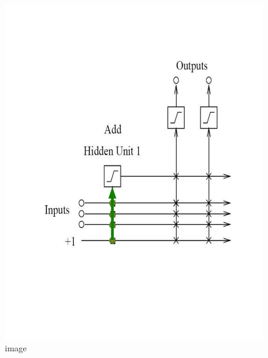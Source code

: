 \documentclass{beamer}
\begin{document}
\begin{frame}
\begin{columns}[t]
\begin{column}{0.5\textwidth}
\begin{figure}
        \includegraphics[scale=0.1\textwidth]{trainInputunit.png}
        \caption{image}
      \end{figure}			
		\end{column}
	\end{columns}
\end{frame}
\end{document}
